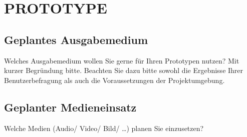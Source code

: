 \section{PROTOTYPE}\label{PROTOTYPE}

\subsection{Geplantes Ausgabemedium}\label{Geplantes Ausgabemedium}
Welches Ausgabemedium wollen Sie gerne für Ihren Prototypen nutzen? Mit kurzer Begründung bitte. Beachten Sie dazu bitte sowohl die Ergebnisse Ihrer Benutzerbefragung als auch die Voraussetzungen der Projektumgebung.

\subsection{Geplanter Medieneinsatz}\label{Geplanter Medieneinsatz}
Welche Medien (Audio/ Video/ Bild/ …) planen Sie einzusetzen?


